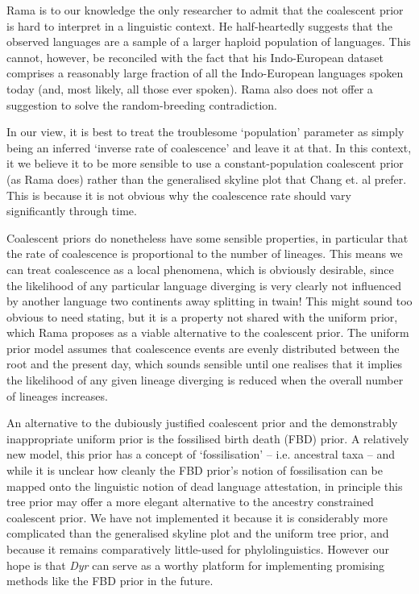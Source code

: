 \documentclass[10pt,journal,compsoc]{IEEEtran}
\begin{document}
Rama is to our knowledge the only researcher to admit that the coalescent prior is hard to interpret in a linguistic context. He half-heartedly suggests that the observed languages are a sample of a larger haploid population of languages\cite{rama2018three}. This cannot, however, be reconciled with the fact that his Indo-European dataset comprises a reasonably large fraction of all the Indo-European languages spoken today (and, most likely, all those ever spoken). Rama also does not offer a suggestion to solve the random-breeding contradiction.

In our view, it is best to treat the troublesome `population' parameter as simply being an inferred `inverse rate of coalescence' and leave it at that. In this context, it we believe it to be more sensible to use a constant-population coalescent prior (as Rama does) rather than the generalised skyline plot that Chang et. al prefer. This is because it is not obvious why the coalescence rate should vary significantly through time.

Coalescent priors do nonetheless have some sensible properties, in particular that the rate of coalescence is proportional to the number of lineages. This means we can treat coalescence as a local phenomena, which is obviously desirable, since the likelihood of any particular language diverging is very clearly not influenced by another language two continents away splitting in twain! This might sound too obvious to need stating, but it is a property not shared with the uniform prior, which Rama proposes as a viable alternative to the coalescent prior. The uniform prior model assumes that coalescence events are evenly distributed between the root and the present day, which sounds sensible until one realises that it implies the likelihood of any given lineage diverging is reduced when the overall number of lineages increases.

An alternative to the dubiously justified coalescent prior and the demonstrably inappropriate uniform prior is the fossilised birth death (FBD) prior\cite{stadler2013birth}. A relatively new model, this prior has a concept of `fossilisation' -- i.e. ancestral taxa -- and while it is unclear how cleanly the FBD prior's notion of fossilisation can be mapped onto the linguistic notion of dead language attestation, in principle this tree prior may offer a more elegant alternative to the ancestry constrained coalescent prior. We have not implemented it because it is considerably more complicated than the generalised skyline plot and the uniform tree prior, and because it remains comparatively little-used for phylolinguistics. However our hope is that  \textit{Dyr} can serve as a worthy platform for implementing promising methods like the FBD prior in the future.
\end{document}
